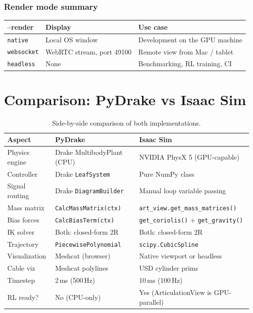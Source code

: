 \documentclass[11pt,a4paper]{article}
\begin{document}
\subsubsection*{Render mode summary}

\begin{center}
\begin{tabular}{lll}
\toprule
\textbf{--render} & \textbf{Display} & \textbf{Use case} \\
\midrule
\texttt{native}    & Local OS window  & Development on the GPU machine \\
\texttt{websocket} & WebRTC stream, port 49100 & Remote view from Mac / tablet \\
\texttt{headless}  & None             & Benchmarking, RL training, CI \\
\bottomrule
\end{tabular}
\end{center}


\section{Comparison: PyDrake vs Isaac Sim}
\label{sec:comparison}

\begin{table}[H]
\centering
\caption{Side-by-side comparison of both implementations.}
\begin{tabular}{p{3.5cm}p{5cm}p{5cm}}
\toprule
\textbf{Aspect} & \textbf{PyDrake} & \textbf{Isaac Sim} \\
\midrule
Physics engine & Drake MultibodyPlant (CPU) & NVIDIA PhysX 5 (GPU-capable) \\
Controller & Drake \texttt{LeafSystem} & Pure NumPy class \\
Signal routing & Drake \texttt{DiagramBuilder} & Manual loop variable passing \\
Mass matrix & \texttt{CalcMassMatrix(ctx)} & \texttt{art\_view.get\_mass\_matrices()} \\
Bias forces & \texttt{CalcBiasTerm(ctx)} & \texttt{get\_coriolis()} + \texttt{get\_gravity()} \\
IK solver & Both: closed-form 2R & Both: closed-form 2R \\
Trajectory & \texttt{PiecewisePolynomial} & \texttt{scipy.CubicSpline} \\
Visualization & Meshcat (browser) & Native viewport or headless \\
Cable viz & Meshcat polylines & USD cylinder prims \\
Timestep & 2\,ms (500\,Hz) & 10\,ms (100\,Hz) \\
RL ready? & No (CPU-only) & Yes (ArticulationView is GPU-parallel) \\
\bottomrule
\end{tabular}
\end{table}
\end{document}
